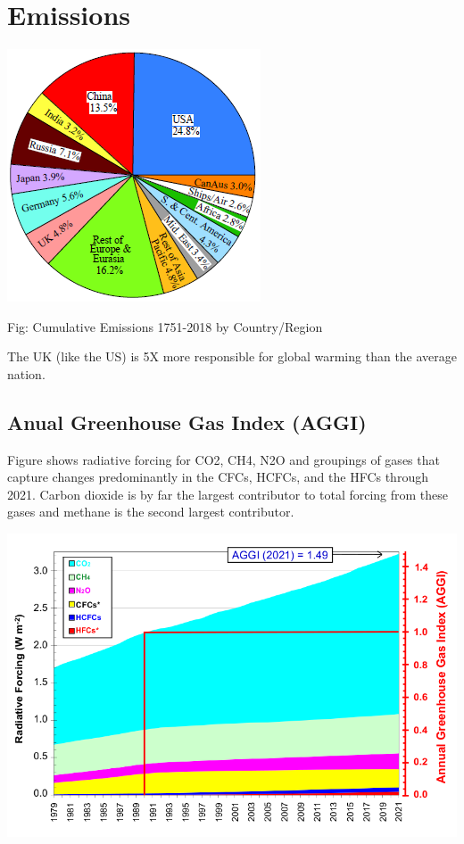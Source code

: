 \documentclass[
]{book}
\begin{document}
\hypertarget{emissions}{%
\section{Emissions}\label{emissions}}

\includegraphics{fig/Emissions_Sum_1751-2018_by_Region.png}

Fig: Cumulative Emissions 1751-2018 by Country/Region

The UK (like the US) is 5X more responsible for global warming than the average nation.

\hypertarget{anual-greenhouse-gas-index-aggi}{%
\subsection{Anual Greenhouse Gas Index (AGGI)}\label{anual-greenhouse-gas-index-aggi}}

Figure shows radiative forcing for CO2, CH4, N2O and groupings of gases that capture changes predominantly in the CFCs, HCFCs, and the HFCs through 2021. Carbon dioxide is by far the largest contributor to total forcing from these gases and methane is the second largest contributor.

\includegraphics{fig/noaa_aggi.fig3.png}
\end{document}

